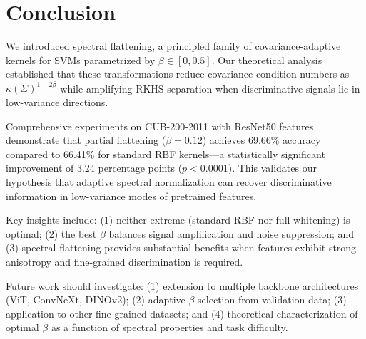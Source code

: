 \documentclass[11pt]{article}
\begin{document}
\section{Conclusion}

We introduced spectral flattening, a principled family of covariance-adaptive kernels for SVMs parametrized by $\beta \in [0, 0.5]$. Our theoretical analysis established that these transformations reduce covariance condition numbers as $\kappa(\Sigma)^{1-2\beta}$ while amplifying RKHS separation when discriminative signals lie in low-variance directions.

Comprehensive experiments on CUB-200-2011 with ResNet50 features demonstrate that partial flattening ($\beta=0.12$) achieves 69.66\% accuracy compared to 66.41\% for standard RBF kernels---a statistically significant improvement of 3.24 percentage points ($p < 0.0001$). This validates our hypothesis that adaptive spectral normalization can recover discriminative information in low-variance modes of pretrained features.

Key insights include: (1) neither extreme (standard RBF nor full whitening) is optimal; (2) the best $\beta$ balances signal amplification and noise suppression; and (3) spectral flattening provides substantial benefits when features exhibit strong anisotropy and fine-grained discrimination is required.

Future work should investigate: (1) extension to multiple backbone architectures (ViT, ConvNeXt, DINOv2); (2) adaptive $\beta$ selection from validation data; (3) application to other fine-grained datasets; and (4) theoretical characterization of optimal $\beta$ as a function of spectral properties and task difficulty.



\end{document}
